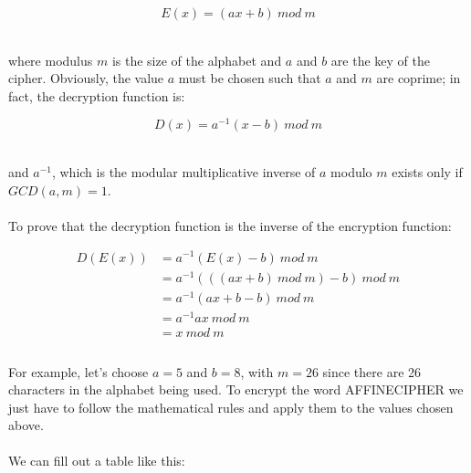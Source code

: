 \documentclass[Lau,binding=0.6cm,oneside]{sapthesis}
\begin{document}
\begin{equation}
E{(x)} = (ax + b) \ mod \ m
\end{equation}

\ \\where modulus $m$ is the size of the alphabet and $a$ and $b$ are the key of the cipher. Obviously, the value $a$ must be chosen such that $a$ and $m$ are coprime; in fact, the decryption function is:

\begin{equation}
D{(x)} = a^{-1}(x-b)\ mod \ m
\end{equation}

\ \\and $a^{-1}$, which is the modular multiplicative inverse of $a$ modulo $m$ exists only if $GCD(a, m) = 1$.\\\\
To prove that the decryption function is the inverse of the encryption function:

\begin{equation}
\begin{split}
D{(E{(x)})} &= a^{-1}(E{(x)}-b)\ mod\ m\\
				&= a^{-1}(((ax + b) \ mod \ m) - b)\ mod\ m\\
				&= a^{-1}(ax + b - b) \ mod \ m\\
				&= a^{-1}ax \ mod \ m\\
				&= x \ mod \ m\\
\end{split}
\end{equation}
\ \\
For example, let's choose $a = 5$ and $b = 8$, with $m = 26$ since there are 26 characters in the alphabet being used. To encrypt the word \textsf{AFFINECIPHER} we just have to follow the mathematical rules and apply them to the values chosen above. \\\\We can fill out a table like this:\\\\
\end{document}
